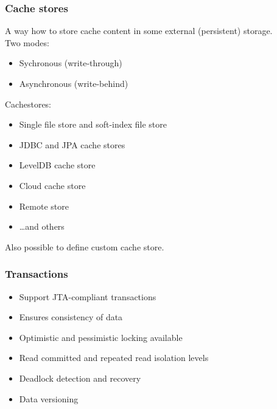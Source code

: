 \documentclass[10pt,utf8]{beamer}
\begin{document}
\begin{frame}
	\frametitle{Cache stores}
	A way how to store cache content in some external (persistent) storage.\\
	Two modes:
	\begin{itemize}
	 \item Sychronous (write-through)
	 \item Asynchronous (write-behind)
	\end{itemize}
	Cachestores:
	\begin{itemize}
		\item Single file store and soft-index file store
		\item JDBC and JPA cache stores
		\item LevelDB cache store
		\item Cloud cache store
		\item Remote store
		\item \dots and others
  \end{itemize}
	Also possible to define custom cache store.
\end{frame}

\begin{frame}
	\frametitle{Transactions}
	\begin{itemize}
	 \item Support JTA-compliant transactions
	 \item Ensures consistency of data
	 \item Optimistic and pessimistic locking available
	 \item Read committed and repeated read isolation levels
	 \item Deadlock detection and recovery
	 \item Data versioning
	\end{itemize}
\end{frame}
\end{document}
